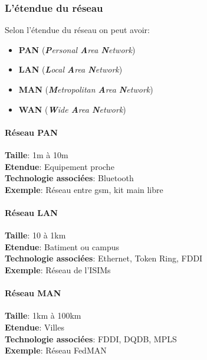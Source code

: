  \subsubsection{L'étendue du réseau}
 Selon l'étendue du réseau on peut avoir:
 \begin{itemize}
	 \item \textbf{PAN} (\textit{\textbf{P}ersonal \textbf{A}rea \textbf{N}etwork})
	 \item \textbf{LAN} (\textit{\textbf{L}ocal \textbf{A}rea \textbf{N}etwork})
	 \item \textbf{MAN} (\textit{\textbf{M}etropolitan \textbf{A}rea \textbf{N}etwork})
	 \item \textbf{WAN} (\textit{\textbf{W}ide \textbf{A}rea \textbf{N}etwork})
 \end{itemize}

 \paragraph{Réseau PAN}\leavevmode

 \medskip

 \indent
 \textbf{Taille}: 1m à 10m\\
 \indent
 \textbf{Etendue}: Equipement proche\\
 \indent
 \textbf{Technologie associées}: Bluetooth\\
 \indent
 \textbf{Exemple}: Réseau entre gsm, kit main libre\\

 \paragraph{Réseau LAN}\leavevmode

 \medskip

 \indent
 \textbf{Taille}: 10 à 1km\\
 \indent
 \textbf{Etendue}: Batiment ou campus\\
 \indent
 \textbf{Technologie associées}: Ethernet, Token Ring, FDDI\\
 \indent
 \textbf{Exemple}: Réseau de l'ISIMs\\

 \paragraph{Réseau MAN}\leavevmode

 \medskip

 \indent
 \textbf{Taille}: 1km à 100km\\
 \indent
 \textbf{Etendue}: Villes\\
 \indent
 \textbf{Technologie associées}: FDDI, DQDB, MPLS\\
 \indent
 \textbf{Exemple}: Réseau FedMAN\\

